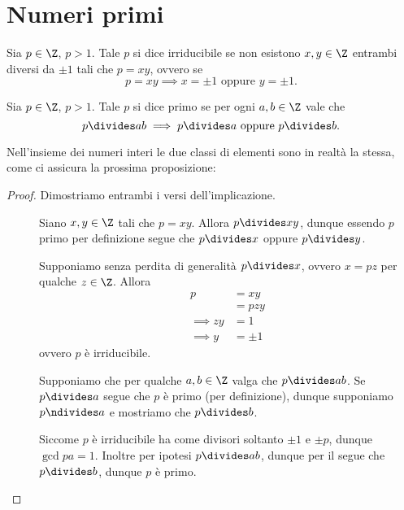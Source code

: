 \section{Numeri primi}

\begin{definition}
    [Irreducibile]
    Sia $p \in \Z$, $p > 1$. Tale $p$ si dice irriducibile se non esistono $x, y \in \Z$ entrambi diversi da $\pm 1$ tali che $p = xy$, ovvero se \begin{equation}
        p = xy \implies x = \pm 1 \text{ oppure } y = \pm 1.
    \end{equation}
\end{definition}

\begin{definition}
    [Primo]
    Sia $p \in \Z$, $p > 1$. Tale $p$ si dice primo se per ogni $a, b \in \Z$ vale che \begin{equation}
        p \divides ab \implies p \divides a \text{ oppure } p \divides b.
    \end{equation}
\end{definition}

Nell'insieme dei numeri interi le due classi di elementi sono in realtà la stessa, come ci assicura la prossima proposizione:
\begin{proof}
    Dimostriamo entrambi i versi dell'implicazione.
    \begin{description}
        \item[\boximpl ] Siano $x, y \in \Z$ tali che $p = xy$. Allora $p \divides xy$, dunque essendo $p$ primo per definizione segue che $p \divides x$ oppure $p \divides y$.
        
        Supponiamo senza perdita di generalità $p \divides x$, ovvero $x = pz$ per qualche $z \in \Z$. Allora \begin{align*}
            p &= xy \\
            &= pzy \\
            \implies zy &= 1 \\
            \implies y &= \pm 1
        \end{align*} ovvero $p$ è irriducibile.
        \item[\boximplby] Supponiamo che per qualche $a, b \in \Z$ valga che $p \divides ab$. Se $p \divides a$ segue che $p$ è primo (per definizione), dunque supponiamo $p \ndivides a$ e mostriamo che $p \divides b$.
        
        Siccome $p$ è irriducibile ha come divisori soltanto $\pm 1$ e $\pm p$, dunque $\gcd{p}{a} = 1$. Inoltre per ipotesi $p \divides ab$, dunque per il  segue che $p \divides b$, dunque $p$ è primo.
    \end{description}
\end{proof}

